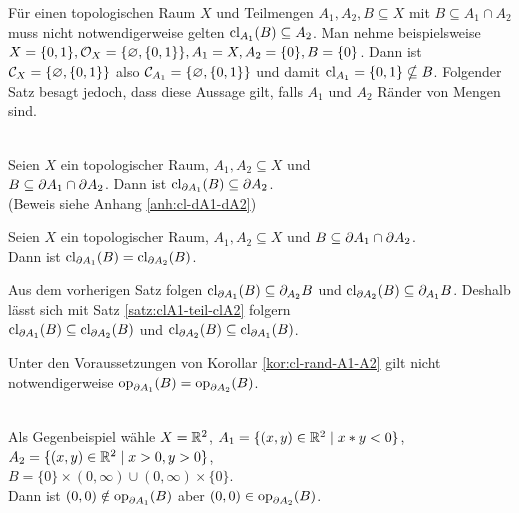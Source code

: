     Für einen topologischen Raum $X$ und Teilmengen $A_1, A_2, B \subseteq X$ mit $B \subseteq A_1 \cap A_2$ muss nicht notwendigerweise gelten $\text{cl}_{A_1}(B) \subseteq A_2$. 
    Man nehme beispielsweise $X = \{0,1\}, \mathcal{O}_X = \{\varnothing, \{0,1\}\}, A_1 = X, A_2 = \{0\}, B = \{0\}$. Dann ist $\mathcal{C}_X = \{\varnothing, \{0,1\}\}$ also $\mathcal{C}_{A_1} = \{\varnothing, \{0,1\}\}$ und damit $\text{cl}_{A_1} = \{0,1\} \nsubseteq B$.
    Folgender Satz besagt jedoch, dass diese Aussage gilt, falls $A_1$ und $A_2$ Ränder von Mengen sind.
    \begin{satz}\label{satz:cl-dA1-dA2}\ \\
        Seien $X$ ein topologischer Raum, $A_1, A_2 \subseteq X$ und \\
        $B \subseteq \partial A_1 \cap \partial A_2$.
        Dann ist $\text{cl}_{\partial A_1}(B) \subseteq \partial A_2$.\\
        (Beweis siehe Anhang \ref{anh:cl-dA1-dA2})
    \end{satz}


    \begin{kor}\label{kor:cl-rand-A1-A2}
        Seien $X$ ein topologischer Raum, $A_1, A_2 \subseteq X$ und $B \subseteq \partial A_1 \cap \partial A_2$.\\
        Dann ist ${\text{cl}_{\partial A_1}(B) = \text{cl}_{\partial A_2}(B)}$.
    \end{kor}
    \begin{bew}
        Aus dem vorherigen Satz folgen $\text{cl}_{\partial A_1}(B) \subseteq \partial_{A_2}B$ und $\text{cl}_{\partial A_2}(B) \subseteq \partial_{A_1}B$. Deshalb lässt sich mit Satz \ref{satz:clA1-teil-clA2} folgern \\
        ${\text{cl}_{\partial A_1}(B) \subseteq \text{cl}_{\partial A_2}(B)}$ und ${\text{cl}_{\partial A_2}(B) \subseteq \text{cl}_{\partial A_1}(B)}$.
    \end{bew}

    Unter den Voraussetzungen von Korollar \ref{kor:cl-rand-A1-A2} gilt nicht notwendigerweise ${\text{op}_{\partial A_1}(B) = \text{op}_{\partial A_2}(B)}$.
    
    \begin{gegenbsp}\label{gegenbsp-teiltop}\ \\
        Als Gegenbeispiel wähle $X = \mathbb{R}^2$, ${A_1 = \{(x,y) \in \mathbb{R}^2 \mid x*y < 0\}}$, ${A_2 = \{(x,y) \in \mathbb{R}^2 \mid x > 0, y > 0\}}$, \\
        ${B = \{0\} \times (0, \infty) \cup (0,\infty) \times \{0\}}$.\\
        Dann ist ${(0,0) \notin \text{op}_{\partial A_1}(B)}$ aber ${(0,0) \in \text{op}_{\partial A_2}(B)}$.
    \end{gegenbsp}

